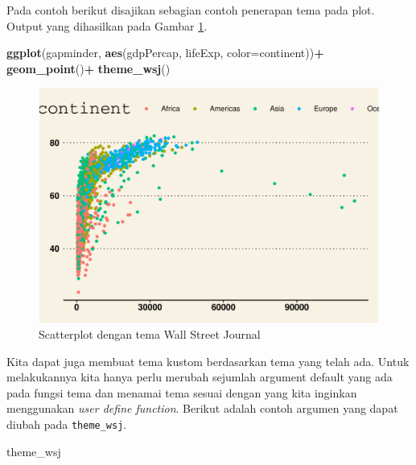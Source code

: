 \documentclass[]{book}
\newenvironment{Shaded}{\begin{snugshade}}{\end{snugshade}}
\newcommand{\KeywordTok}[1]{\textcolor[rgb]{0.13,0.29,0.53}{\textbf{#1}}}
\newcommand{\DataTypeTok}[1]{\textcolor[rgb]{0.13,0.29,0.53}{#1}}
\newcommand{\StringTok}[1]{\textcolor[rgb]{0.31,0.60,0.02}{#1}}
\newcommand{\OperatorTok}[1]{\textcolor[rgb]{0.81,0.36,0.00}{\textbf{#1}}}
\newcommand{\NormalTok}[1]{#1}
\begin{document}
Pada contoh berikut disajikan sebagian contoh penerapan tema pada plot.
Output yang dihasilkan pada Gambar \ref{fig:ggtema2}.

\begin{Shaded}
\begin{Highlighting}[]
\KeywordTok{ggplot}\NormalTok{(gapminder, }\KeywordTok{aes}\NormalTok{(gdpPercap, lifeExp, }
                      \DataTypeTok{color=}\NormalTok{continent))}\OperatorTok{+}
\StringTok{  }\KeywordTok{geom_point}\NormalTok{()}\OperatorTok{+}
\StringTok{  }\KeywordTok{theme_wsj}\NormalTok{()}
\end{Highlighting}
\end{Shaded}

\begin{figure}

{\centering \includegraphics[width=0.7\linewidth]{EnvStat_files/figure-latex/ggtema2-1} 

}

\caption{Scatterplot dengan tema Wall Street Journal}\label{fig:ggtema2}
\end{figure}

Kita dapat juga membuat tema kustom berdasarkan tema yang telah ada.
Untuk melakukannya kita hanya perlu merubah sejumlah argument default
yang ada pada fungsi tema dan menamai tema sesuai dengan yang kita
inginkan menggunakan \emph{user define function}. Berikut adalah contoh
argumen yang dapat diubah pada \texttt{theme\_wsj}.

\begin{Shaded}
\begin{Highlighting}[]
\NormalTok{theme_wsj}
\end{Highlighting}
\end{Shaded}
\end{document}
